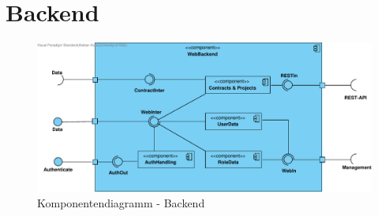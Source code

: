 

\section{Backend}

\begin{figure}[H]
	\centering
	\includegraphics[width=16cm]{img/diagrams/cp_backend.pdf}	
	\caption{Komponentendiagramm - Backend}
	\label{fig:komponentendiagramm-backend}
\end{figure}

\clearpage

